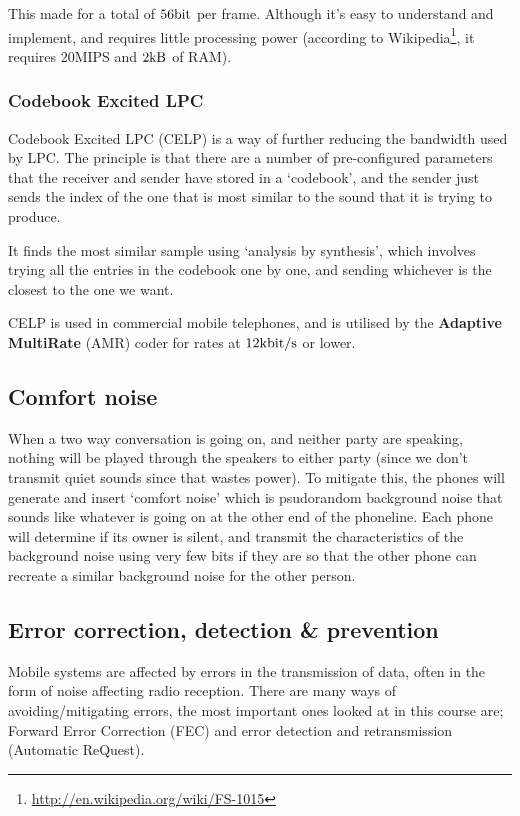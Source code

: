 
This made for a total of $56\si{\bit}$ per frame. Although it's easy to
understand and implement, and requires little processing power (according to
Wikipedia\footnote{\url{http://en.wikipedia.org/wiki/FS-1015}}, it requires
$20$MIPS and $2\si{\kilo\byte}$ of RAM).

\subsubsection{Codebook Excited LPC}

Codebook Excited LPC (CELP) is a way of further reducing the bandwidth used by
LPC. The principle is that there are a number of pre-configured parameters that
the receiver and sender have stored in a `codebook', and the sender just sends
the index of the one that is most similar to the sound that it is trying to
produce.

It finds the most similar sample using `analysis by synthesis', which involves
trying all the entries in the codebook one by one, and sending whichever is the
closest to the one we want. 

CELP is used in commercial mobile telephones, and is utilised by the
\textbf{Adaptive MultiRate} (AMR) coder for rates at
$12\si{\kilo\bit\per\second}$ or lower.

\subsection{Comfort noise}

When a two way conversation is going on, and neither party are speaking, nothing
will be played through the speakers to either party (since we don't transmit
quiet sounds since that wastes power). To mitigate this, the phones will
generate and insert `comfort noise' which is psudorandom background noise that
sounds like whatever is going on at the other end of the phoneline. Each phone
will determine if its owner is silent, and transmit the characteristics of the
background noise using very few bits if they are so that the other phone can
recreate a similar background noise for the other person.

\subsection{Error correction, detection \& prevention}

Mobile systems are affected by errors in the transmission of data, often in the
form of noise affecting radio reception. There are many ways of
avoiding/mitigating errors, the most important ones looked at in this course
are; Forward Error Correction (FEC) and error detection and retransmission
(Automatic ReQuest).


